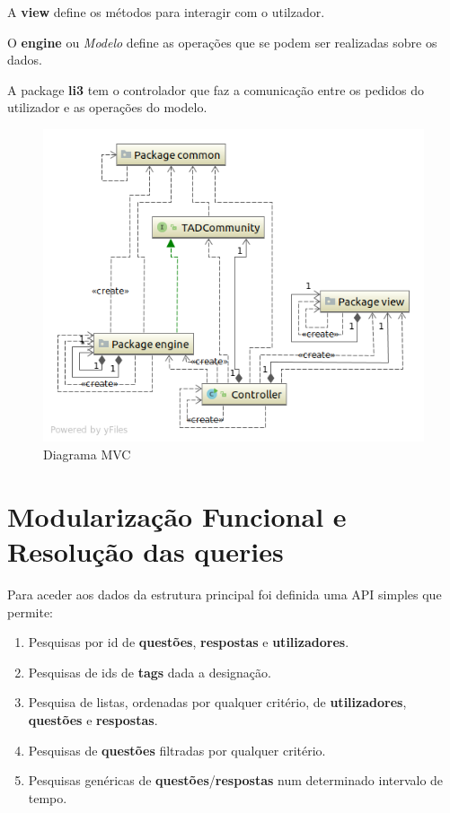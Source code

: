 \documentclass[10pt,a4paper]{report}
\begin{document}
    A \textbf{view} define os métodos para interagir com o utilzador.

    O \textbf{engine} ou \textit{Modelo} define as operações que se podem
    ser realizadas sobre os dados.

    A package \textbf{li3} tem o controlador que faz a comunicação entre os
    pedidos do utilizador e as operações do modelo.

    \begin{figure}[h]
        \centering
        \includegraphics[width=\textwidth]{./images/Top-LevelPackage.png}
        \caption{Diagrama MVC}
    \end{figure}

\chapter{Modularização Funcional e Resolução das queries}
    Para aceder aos dados da estrutura principal foi definida uma API
    simples que permite:
    \begin{enumerate}[1.]
        \item Pesquisas por id de \textbf{questões}, \textbf{respostas} e
        \textbf{utilizadores}.
        \item Pesquisas de ids de \textbf{tags} dada a designação.
        \item Pesquisa de listas, ordenadas por qualquer critério, de
        \textbf{utilizadores}, \textbf{questões} e \textbf{respostas}.
        \item Pesquisas de \textbf{questões} filtradas por qualquer critério.
        \item Pesquisas genéricas de \textbf{questões}/\textbf{respostas}
        num determinado intervalo de tempo.
    \end{enumerate}
\end{document}

